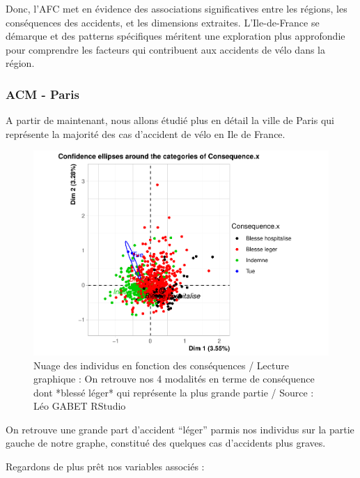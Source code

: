 \documentclass[french,]{compterendu}
\theoremstyle{urcastyle}
\theoremstyle{remark}
\begin{document}
Donc, l'AFC met en évidence des associations significatives entre les régions, les conséquences des accidents, et les dimensions extraites. L'Ile-de-France se démarque et des patterns spécifiques méritent une exploration plus approfondie pour comprendre les facteurs qui contribuent aux accidents de vélo dans la région.

\hypertarget{acm---paris}{%
\subsubsection{ACM - Paris}\label{acm---paris}}

A partir de maintenant, nous allons étudié plus en détail la ville de Paris qui représente la majorité des cas d'accident de vélo en Ile de France.

\begin{figure}[H]

{\centering \includegraphics[width=0.9\linewidth]{Rapport_ADD_LEO-GABET_files/figure-latex/acmPARIS1-1} 

}

\caption{Nuage des individus en fonction des conséquences / Lecture graphique : On retrouve nos 4 modalités en terme de conséquence dont *blessé léger* qui représente la plus grande partie / Source : Léo GABET RStudio}\label{fig:acmPARIS1}
\end{figure}

On retrouve une grande part d'accident ``léger'' parmis nos individus sur la partie gauche de notre graphe, constitué des quelques cas d'accidents plus graves.

Regardons de plus prêt nos variables associés :
\end{document}
